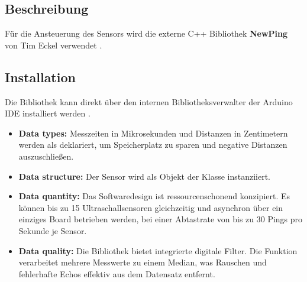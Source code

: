 \subsection{Beschreibung}                                                                                                 
Für die Ansteuerung des Sensors wird die externe C++ Bibliothek \textbf{NewPing} von Tim Eckel verwendet \cite{Eckel:2023}.

\subsection{Installation}                                                                                            
Die Bibliothek kann direkt über den internen Bibliotheksverwalter der Arduino IDE installiert werden \cite{Eckel:2023}.
\begin{itemize}                                                                                                                                                                                   
	\item \textbf{Data types:} Messzeiten in Mikrosekunden und Distanzen in Zentimetern werden als  deklariert, um Speicherplatz zu sparen und negative Distanzen auszuschließen.
	\item \textbf{Data structure:} Der Sensor wird als Objekt der Klasse  instanziiert.                                                                                                                                                            
	\item \textbf{Data quantity:} Das Softwaredesign ist ressourcenschonend konzipiert. Es können bis zu 15 Ultraschallsensoren gleichzeitig und asynchron über ein einziges Board betrieben werden, bei einer Abtastrate von bis zu 30 Pings pro Sekunde je Sensor.
	\item \textbf{Data quality:} Die Bibliothek bietet integrierte digitale Filter. Die Funktion  verarbeitet mehrere Messwerte zu einem Median, was Rauschen und fehlerhafte Echos effektiv aus dem Datensatz entfernt.
\end{itemize}

